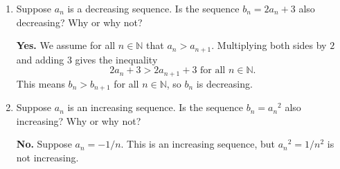 \documentclass[12pt]{article}
\newcommand{\N}{\mathbb{N}}
\begin{document}
\begin{enumerate}
\item Suppose $a_n$ is a decreasing sequence.  Is the sequence $b_n = 2 a_n + 3$ also decreasing?  Why or why not?
\vfill

\textbf{Yes.}  We assume for all $n \in \N$ that $a_n > a_{n+1}$.  Multiplying both sides by $2$ and adding $3$ gives the inequality
$$
2 a_n + 3 > 2 a_{n+1} + 3 \mbox{ for all $n \in \N$.}
$$
This means $b_n > b_{n+1}$ for all $n \in \N$, so $b_n$ is decreasing.
\vfill

\item Suppose $a_n$ is an increasing sequence.  Is the sequence $b_n = {a_n}^2$ also increasing?  Why or why not?
\vfill

\textbf{No.}  Suppose $a_n = -1/n$.  This is an increasing sequence, but
${a_n}^2 = 1/n^2$ is not increasing.
\vfill

\end{enumerate}
\end{document}
